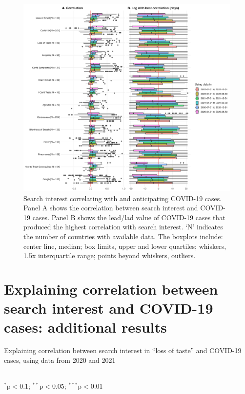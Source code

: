 \documentclass{article}
\begin{document}
\begin{figure}[H]
    \includegraphics[width=1\textwidth]{figures/cor_halfyear_lag_fig.png}
    \caption{Search interest correlating with and anticipating COVID-19 cases. Panel A shows the correlation between search interest and COVID-19 cases. Panel B shows the lead/lad value of COVID-19 cases that produced the highest correlation with search interest. `N' indicates the number of countries with available data. The boxplots include: center line, median; box limits, upper and lower quartiles; whiskers, 1.5x interquartile range; points beyond whiskers, outliers.}
    \label{fig:cor_halfyear_lag_fig}
\end{figure}

\newpage
\section{Explaining correlation between search interest and COVID-19 cases: additional results}
\label{si:lm_cor_searchinterest}

\newpage
\setlength{\tabcolsep}{4pt}
\begin{table}[H]
\centering
\caption{Explaining correlation between search interest in ``loss of taste'' and COVID-19 cases, using data from 2020 and 2021}
 \\
\flushleft $^{*}$p$<$0.1; $^{**}$p$<$0.05; 
$^{***}$p$<$0.01\label{tab:cor_reg_table_loss_of_taste}
\label{tab:cor_reg_table_taste}
\end{table}
\end{document}
